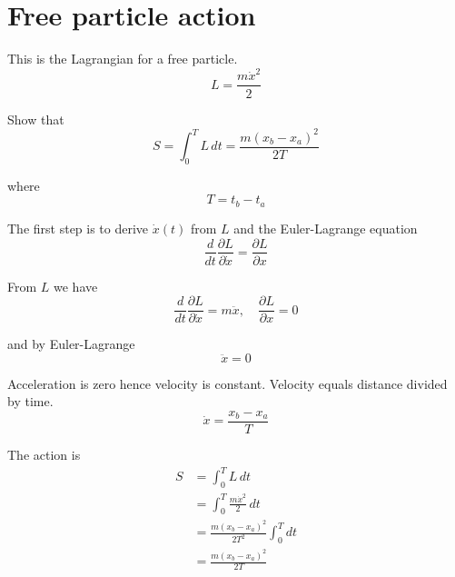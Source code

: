

\section*{Free particle action}

This is the Lagrangian for a free particle.
\begin{equation*}
L=\frac{m\dot x^2}{2}
\end{equation*}

Show that
\begin{equation*}
S=\int_0^TL\,dt=\frac{m(x_b-x_a)^2}{2T}
\end{equation*}

where
\begin{equation*}
T=t_b-t_a
\end{equation*}

The first step is to derive $\dot x(t)$ from $L$ and the Euler-Lagrange equation
\begin{equation*}
\frac{d}{dt}\frac{\partial L}{\partial\dot x}=\frac{\partial L}{\partial x}
\end{equation*}

From $L$ we have
\begin{equation*}
\frac{d}{dt}\frac{\partial L}{\partial\dot x}=m\ddot x,\quad
\frac{\partial L}{\partial x}=0
\end{equation*}

and by Euler-Lagrange
\begin{equation*}
\ddot x=0
\end{equation*}

Acceleration is zero hence velocity is constant.
Velocity equals distance divided by time.
\begin{equation*}
\dot x=\frac{x_b-x_a}{T}
\end{equation*}

The action is
\begin{align*}
S&=\int_0^TL\,dt
\\
&=\int_0^T\frac{m\dot x^2}{2}\,dt
\\
&=\frac{m(x_b-x_a)^2}{2T^2}\int_0^Tdt
\\
&=\frac{m(x_b-x_a)^2}{2T}
\tag{1}
\end{align*}


